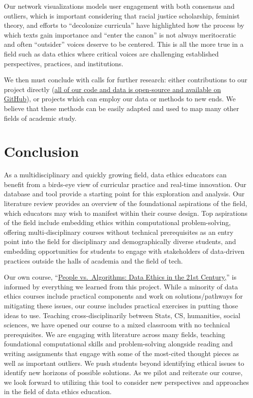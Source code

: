 \documentclass[
]{article}
\begin{document}
Our network visualizations models user engagement with both consensus
and outliers, which is important considering that racial justice
scholarship, feminist theory, and efforts to ``decolonize curricula''
have highlighted how the process by which texts gain importance and
``enter the canon'' is not always meritocratic and often ``outsider''
voices deserve to be centered. This is all the more true in a field such
as data ethics where critical voices are challenging established
perspectives, practices, and institutions.

We then must conclude with calls for further research: either
contributions to our project directly
(\href{https://github.com/JonathanReeve/data-ethics-literature-review}{all
of our code and data is open-source and available on GitHub}), or
projects which can employ our data or methods to new ends. We believe
that these methods can be easily adapted and used to map many other
fields of academic study.

\hypertarget{conclusion}{%
\section{Conclusion}\label{conclusion}}

As a multidisciplinary and quickly growing field, data ethics educators
can benefit from a birds-eye view of curricular practice and real-time
innovation. Our database and tool provide a starting point for this
exploration and analysis. Our literature review provides an overview of
the foundational aspirations of the field, which educators may wish to
manifest within their course design. Top aspirations of the field
include embedding ethics within computational problem-solving, offering
multi-disciplinary courses without technical prerequisites as an entry
point into the field for disciplinary and demographically diverse
students, and embedding opportunities for students to engage with
stakeholders of data-driven practices outside the halls of academia and
the field of tech.

Our own course, ``\href{http://data-ethics.jonreeve.com/}{People
vs.~Algorithms: Data Ethics in the 21st Century,}'' is informed by
everything we learned from this project. While a minority of data ethics
courses include practical components and work on solutions/pathways for
mitigating these issues, our course includes practical exercises in
putting those ideas to use. Teaching cross-disciplinarily between Stats,
CS, humanities, social sciences, we have opened our course to a mixed
classroom with no technical prerequisites. We are engaging with
literature across many fields, teaching foundational computational
skills and problem-solving alongside reading and writing assignments
that engage with some of the most-cited thought pieces as well as
important outliers. We push students beyond identifying ethical issues
to identify new horizons of possible solutions. As we pilot and
reiterate our course, we look forward to utilizing this tool to consider
new perspectives and approaches in the field of data ethics education.
\end{document}
